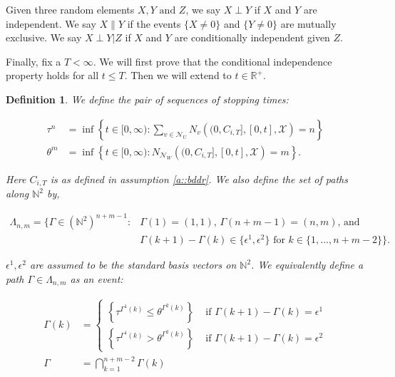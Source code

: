 \documentclass[12pt]{article}
\newcommand{\mb}{\mathbb}
\newcommand{\mc}{\mathcal}
\newcommand{\te}{\text}
\newcommand{\ep}{\epsilon}
\newcommand{\ind}{\hspace{24pt}}
\newcommand{\sta}{\mc{X}}							%
\newcommand{\neigh}[1]{\mc{N}_{#1}}					%
\newcommand{\indx}[1]{^{#1}}						%
\newcommand{\Xf}{X}									%
\newcommand{\poiss}{N}								%
\newcommand{\poissv}[1]{_{#1}}						%
\newcommand{\jumpibd}[2]{C_{#1,#2}}					%
\newcommand{\seto}{U}								%
\newcommand{\sett}{W}								%
\newcommand{\mutex}{\|}								%
\newcommand{\rtt}{\theta}							%
\newcommand{\apath}{\Gamma}						%
\newcommand{\pathset}[2]{\Lambda_{#1,#2}}		%
\newcommand{\indo}{n}							%
\newcommand{\indt}{m}							%
\newcommand{\Xg}{Y}									%
\newcommand{\rt}{\tau}								%
\newcommand{\ev}[1]{\ep^{#1}}						%
\newcommand{\Xh}{Z}									%
\newtheorem{defn}[thms]{Definition}
\begin{document}
\ind Given three random elements \(\Xf,\Xg \te{ and } \Xh\), we say \(\Xf\perp \Xg\) if \(\Xf\) and \(\Xg\) are independent. We say \(\Xf\mutex \Xg\) if the events \(\{\Xf\neq 0\}\) and \(\{\Xg \neq 0\}\) are mutually exclusive. We say \(\Xf\perp \Xg|\Xh\) if \(\Xf\) and \(\Xg\) are conditionally independent given \(\Xh\).

\ind Finally, fix a \(T < \infty\). We will first prove that the conditional independence property holds for all \(t \leq T\). Then we will extend to \(t \in \mb{R}^+\).

\begin{defn}
We define the pair of sequences of stopping times:

\begin{align*}
\rt\indx{\indo} &= \inf \left\{t \in [0,\infty): \sum_{v \in \neigh{\seto}}\poiss\poissv{v}\left((0,\jumpibd{i}{T}],[0,t],\sta \right) = \indo\right\}\\
\rtt\indx{\indt} &= \inf \left\{t \in [0,\infty): \poiss\poissv{\neigh{\sett}}\left((0,\jumpibd{i}{T}],[0,t],\sta \right) = \indt\right\}.
\end{align*}

Here \(\jumpibd{i}{T}\) is as defined in assumption \ref{a::bddr}. We also define the set of paths along \(\mb{N}^2\) by,

\begin{align}
\pathset{\indo}{\indt} = \{\apath \in (\mb{N}^2)^{\indo+\indt-1}: &\apath(1) = (1,1)\te{, } \apath(\indo+\indt-1) = (\indo,\indt)\te{, and } \nonumber\\
&\apath(k+1) - \apath(k)\in \{\ev{1},\ev{2}\}\te{ for }k\in \{1,\dots, \indo+\indt-2\}\}.
\label{CIpf::Lambda}
\end{align}

\(\ev{1},\ev{2}\) are assumed to be the standard basis vectors on \(\mb{N}^2\). We equivalently define a path \(\apath \in \pathset{\indo}{\indt}\) as an event:

\begin{align}
\apath(k) &= \begin{cases}
\left\{\rt\indx{\apath\indx{1}(k)} \leq \rtt\indx{\apath\indx{2}(k)}\right\} &\te{ if } \apath(k+1) - \apath(k) = \ev{1}\\
\left\{\rt\indx{\apath\indx{1}(k)} > \rtt\indx{\apath\indx{2}(k)}\right\} &\te{ if } \apath(k+1) - \apath(k) = \ev{2}
\end{cases}\\
\apath &= \bigcap_{k=1}^{\indo+\indt-2} \apath(k)
\label{CIpf::Gamma}
\end{align}
\label{CIpf::GammaLambda}
\end{defn}
\end{document}
